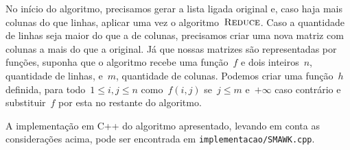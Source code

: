 No início do algoritmo, precisamos gerar a lista ligada original e, caso haja mais colunas do que linhas, aplicar uma vez o algoritmo~$\textsc{Reduce}$. Caso a quantidade de linhas seja maior do que a de colunas, precisamos criar uma nova matriz com colunas a mais do que a original. Já que nossas matrizes são representadas por funções, suponha que o algoritmo recebe uma função~$f$ e dois inteiros~$n$, quantidade de linhas, e~$m$, quantidade de colunas. Podemos criar uma função~$h$ definida, para todo~$1 \leq i,j \leq n$ como~$f(i,j)$ se~$j \leq m$ e~$+\infty$ caso contrário e substituir~$f$ por esta no restante do algoritmo.

A implementação em C++ do algoritmo apresentado, levando em conta as considerações acima, pode ser encontrada em \texttt{implementacao/SMAWK.cpp}.
